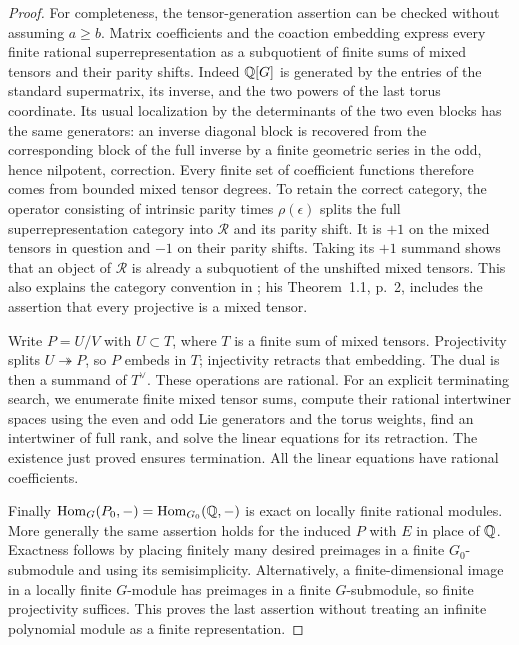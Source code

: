 \begin{proof}
For completeness, the tensor-generation assertion can be checked
without assuming $a\geq b$.  Matrix coefficients and the coaction
embedding express every finite rational superrepresentation as a
subquotient of finite sums of mixed tensors and their parity shifts.
Indeed $\mathbb Q[G]$ is generated by the entries of the standard
supermatrix, its inverse, and the two powers of the last torus
coordinate.  Its usual localization by the determinants of the two
even blocks has the same generators: an inverse diagonal block is
recovered from the corresponding block of the full inverse by a
finite geometric series in the odd, hence nilpotent, correction.
Every finite set of coefficient functions therefore comes from
bounded mixed tensor degrees.  To retain the correct category,
the operator consisting of intrinsic parity times $\rho(\epsilon)$
splits the full superrepresentation category into $\mathcal R$ and
its parity shift.  It is $+1$ on the mixed tensors in question and
$-1$ on their parity shifts.  Taking its $+1$ summand shows that an
object of $\mathcal R$ is already a subquotient of the unshifted
mixed tensors.  This also explains the category convention in
\citet[section~2, pp.~3--4]{c_heidersdorf2017mixed};
his Theorem~1.1, p.~2, includes the assertion that every projective
is a mixed tensor.

Write $P=U/V$ with $U\subset T$, where $T$ is a finite sum of mixed
tensors.  Projectivity splits $U\twoheadrightarrow P$, so $P$
embeds in $T$; injectivity retracts that embedding.  The dual is
then a summand of $T^\vee$.  These operations are rational.  For an
explicit terminating search, we enumerate finite mixed tensor sums,
compute their rational intertwiner spaces using the even and odd
Lie generators and the torus weights, find an intertwiner of full
rank, and solve the linear equations for its retraction.  The
existence just proved ensures termination.  All the linear
equations have rational coefficients.

Finally $\operatorname{Hom}_{G}(P_0,-)=
\operatorname{Hom}_{G_0}(\mathbb Q,-)$ is exact on locally finite rational
modules.  More generally the same assertion holds for the induced
$P$ with $E$ in place of $\mathbb Q$.  Exactness follows by placing
finitely many desired preimages in a finite $G_0$-submodule and
using its semisimplicity.  Alternatively, a finite-dimensional
image in a locally finite $G$-module has preimages in a finite
$G$-submodule, so finite projectivity suffices.  This proves the
last assertion without treating an infinite polynomial module as
a finite representation.
\end{proof}

